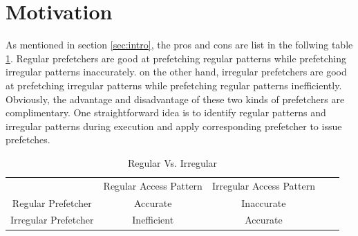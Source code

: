 \section{Motivation}
\label{sec:motivation}
As mentioned in section \ref{sec:intro}, the pros and cons are list in the follwing table \ref{table:regVsirreg}. Regular prefetchers are good at prefetching regular patterns while prefetching irregular patterns inaccurately. on the other hand, irregular prefetchers are good at prefetching irregular patterns while prefetching regular patterns inefficiently. Obviously, the advantage and disadvantage of these two kinds of prefetchers are complimentary. One straightforward idea is to identify regular patterns and irregular patterns during execution and apply corresponding prefetcher to issue prefetches.

\begin{table}[ht!]
\centering
\begin{tabular}{cccll}
\cline{1-3}
\multicolumn{1}{|c|}{}                     & \multicolumn{1}{c|}{Regular Access Pattern}             & \multicolumn{1}{c|}{Irregular Access Pattern}          &  &  \\ \cline{1-3}
\multicolumn{1}{|c|}{Regular Prefetcher}   & \multicolumn{1}{c|}{Accurate}              & \multicolumn{1}{c|}{{\color[HTML]{FE0000} Inaccurate}} &  &  \\ \cline{1-3}
\multicolumn{1}{|c|}{Irregular Prefetcher} & \multicolumn{1}{c|}{{\color[HTML]{FE0000} Inefficient}} & \multicolumn{1}{c|}{Accurate} &  &  \\ \cline{1-3}
\end{tabular}
\caption{Regular Vs. Irregular}
\label{table:regVsirreg}
\end{table}

